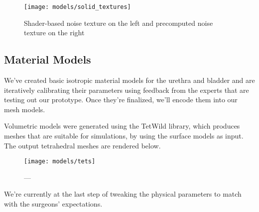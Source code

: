 \begin{figure}
  \centering
  \texttt{[image: models/solid\_textures]}
  \caption{Shader-based noise texture on the left and precomputed noise texture on the right}
  \label{fig:solid_textures}
 \end{figure}

\subsection{Material Models}
We've created basic isotropic material models for the urethra and bladder and are iteratively calibrating their parameters using feedback from the experts that are testing out our prototype. Once they're finalized, we'll encode them into our mesh models.

Volumetric models were generated using the TetWild library, which produces meshes that are suitable for  simulations, by using the surface models as input. The output tetrahedral meshes are rendered below.

\begin{figure}
  \centering%
  \texttt{[image: models/tets]}
  \caption{---}
  \label{fig:tetra_meshes}
\end{figure}

We're currently at the last step of tweaking the physical parameters to match with the surgeons' expectations.

\clearpage%
